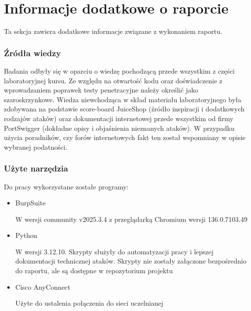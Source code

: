 \documentclass[journal,onecolumn]{IEEEtran}
\begin{document}











\section{Informacje dodatkowe o raporcie}
Ta sekcja zawiera dodatkowe informacje związane z wykonaniem raportu.

\subsubsection{Źródła wiedzy}
Badania odbyły się w oparciu o wiedzę pochodzącą przede wszystkim z części laboratoryjnej kursu. Ze względu na otwartość kodu oraz doświadczenie z wprowadzaniem poprawek testy penetracyjne należy określić jako szaroskrzynkowe. Wiedza niewchodząca w skład materiału laboratoryjnego była zdobywana na podstawie score-board JuiceShop (źródło inspiracji i dodatkowych rodzajów ataków) oraz dokumentacji internetowej przede wszystkim od firmy PortSwigger (dokładne opisy i objaśnienia nieznanych ataków). W przypadku użycia poradników, czy forów internetowych fakt ten został wspomniany w opisie wybranej podatności.

\subsubsection{Użyte narzędzia}
Do pracy wykorzystane zostałe programy:
\begin{itemize}
  \item BurpSuite
  
  W wersji community v2025.3.4 z przeglądarką Chromium wersji 136.0.7103.49 
  \item Python
  
  W wersji 3.12.10. Skrypty służyły do automatyzacji pracy i lepszej dokumentacji technicznej ataków. Skrypty nie zostały załączone bezpośrednio do raportu, ale są dostępne w repozytorium projektu
  \item Cisco AnyConnect
  
  Użyte do ustalenia połączenia do sieci uczelnianej
\end{itemize}
\end{document}
